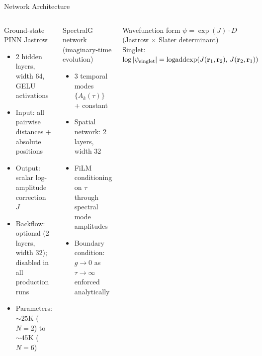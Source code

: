 \documentclass[aspectratio=169,10pt]{beamer}
\begin{document}
\begin{frame}{Network Architecture}
  \begin{columns}[T]
      \begin{block}{Ground-state PINN Jastrow}
        \begin{itemize}
          \item 2 hidden layers, width 64, GELU activations
          \item Input: all pairwise distances + absolute positions
          \item Output: scalar log-amplitude correction $J$
          \item Backflow: optional (2 layers, width 32);
                \alert{disabled} in all production runs
          \item Parameters: ${\sim}25$K ($N=2$) to ${\sim}45$K ($N=6$)
        \end{itemize}
      \end{block}
      \begin{block}{SpectralG network (imaginary-time evolution)}
        \begin{itemize}
          \item 3 temporal modes $\{A_k(\tau)\}$ + constant
          \item Spatial network: 2 layers, width 32
          \item FiLM conditioning on $\tau$ through spectral mode
                amplitudes
          \item Boundary condition: $g \to 0$ as $\tau\to\infty$
                enforced analytically
        \end{itemize}
      \end{block}
      \vspace{0.2cm}
      \begin{alertblock}{Wavefunction form}
        $\psi = \exp(J)\cdot D$ \quad (Jastrow $\times$ Slater determinant)\\[3pt]
        Singlet: $\log|\psi_{\rm singlet}| = \mathrm{logaddexp}(J(\mathbf{r}_1,\mathbf{r}_2),\,J(\mathbf{r}_2,\mathbf{r}_1))$
      \end{alertblock}
  \end{columns}
\end{frame}
\end{document}
